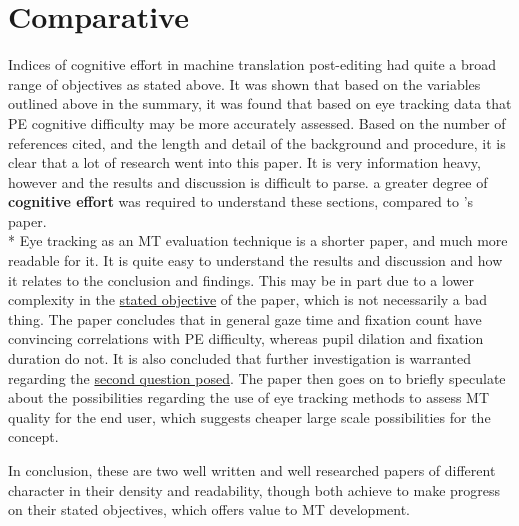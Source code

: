 \documentclass[12pt]{article}
\begin{document}
			
	\section{Comparative}
	Indices of cognitive effort in machine translation post-editing\cite{10.2307/44113775} had quite a broad range of objectives as stated above. It was shown that based on the variables outlined above in the summary, it was found that based on eye tracking data that PE cognitive difficulty may be more accurately assessed. Based on the number of references cited, and the length and detail of the background and procedure, it is clear that a lot of research went into this paper.
	It is very information heavy, however and the results and discussion is difficult to parse. a greater degree of \textbf{cognitive effort} was required to understand these sections, compared to \textcite{EyeTracking}'s paper. \\*
	Eye tracking as an MT evaluation technique\cite{EyeTracking} is a shorter paper, and much more readable for it. It is quite easy to understand the results and discussion and how it relates to the conclusion and findings. This may be in part due to a lower complexity in the \hyperref[sec:objective2]{stated objective} of the paper, which is not necessarily a bad thing.
	The paper concludes that in general gaze time and fixation count have convincing correlations with PE difficulty, whereas pupil dilation and fixation duration do not. It is also concluded that further investigation is warranted regarding the \hyperref[sec:objective2]{second question posed}.
	The paper then goes on to briefly speculate about the possibilities regarding the use of eye tracking methods to assess MT quality for the end user, which suggests cheaper large scale possibilities for the concept.
	 
	In conclusion, these are two well written and well researched papers of different character in their density and readability, though both achieve to make progress on their stated objectives, which offers value to MT development. 
	\printbibliography
\end{document}
